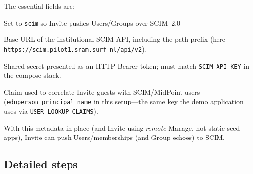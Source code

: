 \documentclass[11pt,a4paper]{article}
\begin{document}
The essential fields are:

\begin{description}[style=nextline,leftmargin=1.2em]
  \item[\texttt{provisioning\_type}]
    Set to \texttt{scim} so Invite pushes Users/Groups over SCIM~2.0.
  \item[\texttt{scim\_url}]
    Base URL of the institutional SCIM API, including the path prefix
    (here \texttt{https://scim.pilot1.sram.surf.nl/api/v2}).
  \item[\texttt{scim\_bearer\_token}]
    Shared secret presented as an HTTP Bearer token; must match
    \texttt{SCIM\_API\_KEY} in the compose stack.
  \item[\texttt{scim\_user\_identifier}]
    Claim used to correlate Invite guests with SCIM/MidPoint users
    (\texttt{eduperson\_principal\_name} in this setup---the same key the
    demo application uses via \texttt{USER\_LOOKUP\_CLAIMS}).
\end{description}

With this metadata in place (and Invite using \emph{remote} Manage, not static
seed apps), Invite can push Users/memberships (and Group echoes) to SCIM.

\subsection{Detailed steps}
\end{document}
